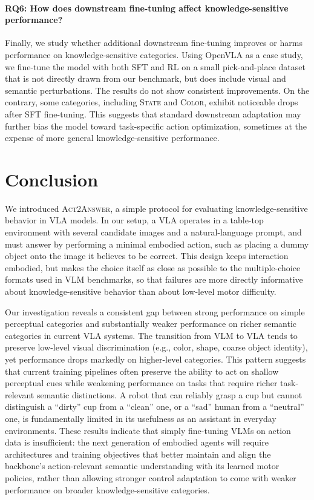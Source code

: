 \documentclass[11pt]{article}
\begin{document}
\paragraph{RQ6: How does downstream fine-tuning affect knowledge-sensitive performance?}
Finally, we study whether additional downstream fine-tuning improves or harms performance on knowledge-sensitive categories. Using OpenVLA as a case study, we fine-tune the model with both SFT and RL on a small pick-and-place dataset that is not directly drawn from our benchmark, but does include visual and semantic perturbations. The results do not show consistent improvements. On the contrary, some categories, including \textsc{State} and \textsc{Color}, exhibit noticeable drops after SFT fine-tuning. This suggests that standard downstream adaptation may further bias the model toward task-specific action optimization, sometimes at the expense of more general knowledge-sensitive performance.

\section{Conclusion}

We introduced \textsc{Act2Answer}, a simple protocol for evaluating knowledge-sensitive behavior in VLA models.
In our setup, a VLA operates in a table-top environment with several candidate images and a natural-language prompt, and must answer by performing a minimal embodied action, such as placing a dummy object onto the image it believes to be correct.
This design keeps interaction embodied, but makes the choice itself as close as possible to the multiple-choice formats used in VLM benchmarks, so that failures are more directly informative about knowledge-sensitive behavior than about low-level motor difficulty.

Our investigation reveals a consistent gap between strong performance on simple perceptual categories and substantially weaker performance on richer semantic categories in current VLA systems.
The transition from VLM to VLA tends to preserve low-level visual discrimination (e.g., color, shape, coarse object identity), yet performance drops markedly on higher-level categories.
This pattern suggests that current training pipelines often preserve the ability to act on shallow perceptual cues while weakening performance on tasks that require richer task-relevant semantic distinctions.
A robot that can reliably grasp a cup but cannot distinguish a ``dirty'' cup from a ``clean'' one, or a ``sad'' human from a ``neutral'' one, is fundamentally limited in its usefulness as an assistant in everyday environments.
These results indicate that simply fine-tuning VLMs on action data is insufficient: the next generation of embodied agents will require architectures and training objectives that better maintain and align the backbone’s action-relevant semantic understanding with its learned motor policies, rather than allowing stronger control adaptation to come with weaker performance on broader knowledge-sensitive categories.
\end{document}
